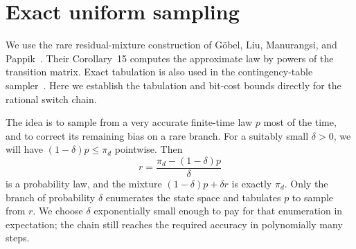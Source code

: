 \section{Exact uniform sampling}
\label{sec:exact-sampling}

We use the rare residual-mixture construction of G\"obel, Liu,
Manurangsi, and Pappik~\cite[Section~3.1, Algorithm~1 and
Theorem~6]{GLMP2024}. Their Corollary~15 computes the approximate law
by powers of the transition matrix. Exact tabulation is also used in
the contingency-table sampler~\cite[Sections~6.3--6.4]{OpenAIContingency2026}. Here we
establish the tabulation and bit-cost bounds directly for the rational
switch chain.

The idea is to sample from a very accurate finite-time law $p$ most of
the time, and to correct its remaining bias on a rare branch. For a
suitably small $\delta>0$, we will have $(1-\delta)p\le\pi_d$ pointwise.
Then
\[
 r=\frac{\pi_d-(1-\delta)p}{\delta}
\]
is a probability law, and the mixture $(1-\delta)p+\delta r$ is exactly
$\pi_d$. Only the branch of probability $\delta$ enumerates the state
space and tabulates $p$ to sample from $r$. We choose $\delta$
exponentially small enough to pay for that enumeration in expectation;
the chain still reaches the required accuracy in polynomially many
steps.

